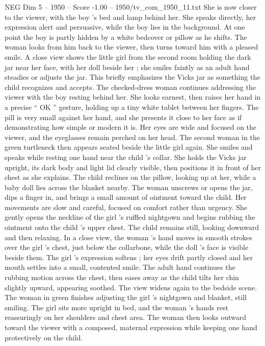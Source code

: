 \begin{textsample}{NEG Dim 5 – 1950 – Score -1.00 – 1950/tv\_com\_1950\_11.txt}
She is now closer to the viewer, with the boy ’s bed and lamp behind her.
She speaks directly, her expression alert and persuasive, while the boy lies in the background.
At one point the boy is partly hidden by a white bedcover or pillow as he shifts.
The woman looks from him back to the viewer, then turns toward him with a pleased smile.
A close view shows the little girl from the second room holding the dark jar near her face, with her doll beside her ; she smiles faintly as an adult hand steadies or adjusts the jar.
This briefly emphasizes the Vicks jar as something the child recognizes and accepts.
The checked-dress woman continues addressing the viewer with the boy resting behind her.
She looks earnest, then raises her hand in a precise “ OK ” gesture, holding up a tiny white tablet between her fingers.
The pill is very small against her hand, and she presents it close to her face as if demonstrating how simple or modern it is.
Her eyes are wide and focused on the viewer, and the eyeglasses remain perched on her head.
The second woman in the green turtleneck then appears seated beside the little girl again.
She smiles and speaks while resting one hand near the child ’s collar.
She holds the Vicks jar upright, its dark body and light lid clearly visible, then positions it in front of her chest as she explains.
The child reclines on the pillow, looking up at her, while a baby doll lies across the blanket nearby.
The woman unscrews or opens the jar, dips a finger in, and brings a small amount of ointment toward the child.
Her movements are slow and careful, focused on comfort rather than urgency.
She gently opens the neckline of the girl ’s ruffled nightgown and begins rubbing the ointment onto the child ’s upper chest.
The child remains still, looking downward and then relaxing.
In a close view, the woman ’s hand moves in smooth strokes over the girl ’s chest, just below the collarbone, while the doll ’s face is visible beside them.
The girl ’s expression softens ; her eyes drift partly closed and her mouth settles into a small, contented smile.
The adult hand continues the rubbing motion across the chest, then eases away as the child tilts her chin slightly upward, appearing soothed.
The view widens again to the bedside scene.
The woman in green finishes adjusting the girl ’s nightgown and blanket, still smiling.
The girl sits more upright in bed, and the woman ’s hands rest reassuringly on her shoulders and chest area.
The woman then looks outward toward the viewer with a composed, maternal expression while keeping one hand protectively on the child.

\end{textsample}
